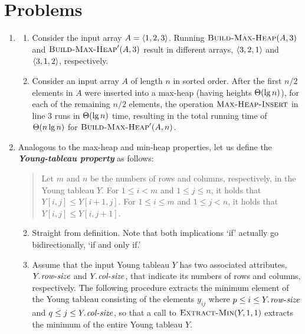 

\section*{Problems}
\begin{enumerate}[\thechapter-1]
%
\item
\begin{enumerate}[\it a.]
\item Consider the input array $A = \left\langle1, 2, 3\right\rangle$. Running $\textnormal{\scshape Build-Max-Heap}(A, 3)$ and $\textnormal{\scshape Build-Max-Heap}'(A, 3)$ result in different arrays, $\left\langle3, 2, 1\right\rangle$ and $\left\langle3, 1, 2\right\rangle$, respectively.
\item Consider an input array $A$ of length $n$ in sorted order. After the first $n/2$ elements in $A$ were inserted into a max-heap (having heights $\Theta\!\left(\lg n\right)$), for each of the remaining $n/2$ elements, the operation $\textnormal{\scshape Max-Heap-Insert}$ in line $3$ runs in $\Theta\!\left(\lg n\right)$ time, resulting in the total running time of $\Theta\!\left(n \lg n\right)$ for $\textnormal{\scshape Build-Max-Heap}'(A, n)$.
\end{enumerate}
%
\setcounter{enumi}{2}
%
\item Analogous to the max-heap and min-heap properties, let us define the \textbf{\textit{Young-tableau property}} as follows:
\begin{quote}
Let $m$ and $n$ be the numbers of rows and columns, respectively, in the Young tableau $Y$. For $1 \leq i < m$ and $1 \leq j \leq n$, it holds that $Y[i, j] \leq Y[i + 1, j]$. For $1 \leq i \leq m$ and $1 \leq j < n$, it holds that $Y[i, j] \leq Y[i, j + 1]$.
\end{quote}
\begin{enumerate}[\it a.]
\setcounter{enumii}{1}
\item Straight from definition. Note that both implications `if' actually go bidirectionally, `if and only if.'
\item Assume that the input Young tableau $Y$ has two associated attributes, $\attrib{Y}{row-size}$ and $\attrib{Y}{col-size}$, that indicate its numbers of rows and columns, respectively. The following procedure extracts the minimum element of the Young tableau consisting of the elements $y_{ij}$ where $p \leq i \leq \attrib{Y}{row-size}$ and $q \leq j \leq \attrib{Y}{col-size}$, so that a call to $\textnormal{\scshape Extract-Min}(Y, 1, 1)$ extracts the minimum of the entire Young tableau $Y$.

\end{enumerate}
\end{enumerate}
